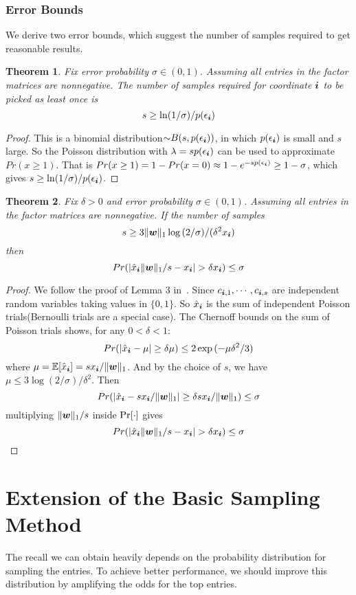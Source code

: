 \documentclass[letterpaper]{article}
\newcommand{\V}[1]{{\boldsymbol{{\MakeLowercase{#1}}}}}
\newcommand{\predx}{\hat{x}_{\V{i}}}
\newcommand{\norm}[2]{\|#1\|_{#2}}
\newtheorem{theorem}{Theorem}
\begin{document}
\subsubsection{Error Bounds}
We derive two error bounds, which suggest the number of samples required to get reasonable results. 
\begin{theorem}\label{theo:ObservationBound}
Fix error probability $\sigma \in (0,1)$.
Assuming all entries in the factor matrices are nonnegative.
The number of samples required for coordinate $\V{i}$ to be picked as least once is
\[
    s \geq \ln(1/\sigma)/p(\epsilon_{\V{i}})
\]
\end{theorem}
\begin{proof}
This is a binomial distribution${\sim}B(s,p(\epsilon_{\V{i}}))$,
in which $p(\epsilon_{\V{i}})$ is small and $s$ large.
So the Poisson distribution with $\lambda = sp(\epsilon_{\V{i}})$
can be used to approximate $Pr(x\geq1)$.
That is $Pr(x\geq1) = 1-Pr(x=0)\approx 1-e^{-sp(\epsilon_{\V{i}})} \geq 1-\sigma$,
which gives $s \geq \ln(1/\sigma)/p(\epsilon_{\V{i}})$.
\end{proof}

\begin{theorem}\label{theo:Bound}
Fix $\delta > 0$ and error probability $\sigma \in (0,1)$.
Assuming all entries in the factor matrices are nonnegative.
If the number of samples
\[
    s \geq 3\norm{\V{w}}{1}\log{(2/\sigma)}/(\delta^2 x_{\V{i}})
\]
then
\[
    Pr(|\predx\norm{\V{W}}{1}/s - x_{\V{i}}| > \delta x_{\V{i}}) \leq \sigma
\]
\end{theorem}

\begin{proof}
We follow the proof of Lemma 3 in~\cite{BaPiKoSe15}.
Since  $c_{\V{i},1},\cdots,c_{\V{i},s}$
are independent random variables taking values in $\{0,1\}$.
So $\predx$ is the sum of independent Poisson trials(Bernoulli trials are a special case).
The Chernoff bounds on the sum of Poisson trials shows, for any $0 <\delta <1 $:
\[
    Pr(|\predx - \mu|\geq\delta\mu) \leq 2\exp{(-\mu\delta^2/3)}
\]
where $\mu=\mathbb{E}[\predx]=sx_{\V{i}}/\norm{\V{W}}{1}$.
And by the choice of $s$, we have
$\mu\leq 3\log{(2/\sigma)/\delta^2}$.
Then
\[
    Pr(|\predx-sx_{\V{i}}/\norm{\V{W}}{1}|\geq\delta sx_{\V{i}}/\norm{\V{W}}{1}) \leq \sigma
\]
multiplying $\norm{\V{W}}{1}/s$ inside ${\rm Pr}[\cdot]$ gives
\[
    Pr(|\predx\norm{\V{W}}{1}/s - x_{\V{i}}| > \delta x_{\V{i}}) \leq \sigma
\]
\end{proof}


\section{Extension of the Basic Sampling Method}
The recall we can obtain heavily depends on 
the probability distribution for sampling the entries. 
To achieve better performance, 
we should improve this distribution by amplifying the odds for the top entries.
\end{document}
